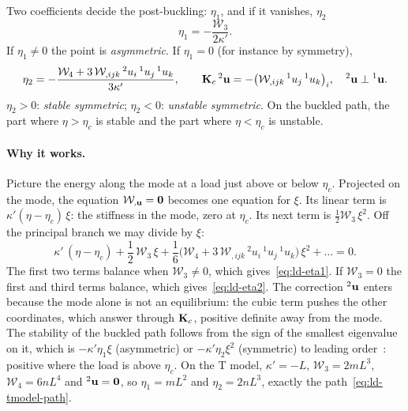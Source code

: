 \begin{gbox}{Two coefficients decide the post-buckling: $\eta_1$, and if it vanishes, $\eta_2$}\label{sec:ld-koitercoef}
%
\begin{equation}\label{eq:ld-eta1}
  \eta_1 = -\frac{\mathcal{W}_3}{2\kappa'} .
\end{equation}
If $\eta_1 \neq 0$ the point is \emph{asymmetric}. If $\eta_1 = 0$ (for instance by symmetry),
\begin{equation}\label{eq:ld-eta2}
  \eta_2 = -\frac{\mathcal{W}_4 + 3\,\mathcal{W}_{,ijk}\,{}^2u_i\,{}^1u_j\,{}^1u_k}{3\kappa'},
  \qquad
  \mathbf{K}_c\,{}^2\mathbf{u} = -\bigl(\mathcal{W}_{,ijk}\,{}^1u_j\,{}^1u_k\bigr)_i,
  \quad {}^2\mathbf{u}\perp{}^1\mathbf{u} .
\end{equation}
$\eta_2 > 0$: \emph{stable symmetric}; $\eta_2 < 0$: \emph{unstable symmetric}.
On the buckled path, the part where $\eta > \eta_c$ is stable and the part where
$\eta < \eta_c$ is unstable.
\end{gbox}

\paragraph{Why it works.}
Picture the energy along the mode at a load just above or below $\eta_c$. Projected
on the mode, the equation $\mathcal{W}_{,\mathbf{u}} = \mathbf{0}$ becomes one equation for
$\xi$. Its linear term is $\kappa'(\eta - \eta_c)\,\xi$: the stiffness in the mode,
zero at $\eta_c$. Its next term is $\tfrac12\mathcal{W}_3\,\xi^2$. Off the principal
branch we may divide by $\xi$:
\begin{equation}\label{eq:ld-reduced}
  \kappa'\,(\eta - \eta_c) + \frac12\,\mathcal{W}_3\,\xi
  + \frac16\bigl(\mathcal{W}_4 + 3\,\mathcal{W}_{,ijk}\,{}^2u_i\,{}^1u_j\,{}^1u_k\bigr)\,\xi^2
  + \dots = 0 .
\end{equation}
The first two terms balance when $\mathcal{W}_3 \neq 0$, which
gives~\eqref{eq:ld-eta1}. If $\mathcal{W}_3 = 0$ the first and third terms balance,
which gives~\eqref{eq:ld-eta2}. The correction ${}^2\mathbf{u}$ enters because the mode
alone is not an equilibrium: the cubic term pushes the other coordinates, which
answer through $\mathbf{K}_c$, positive definite away from the mode. The stability of
the buckled path follows from the sign of the smallest eigenvalue on it, which is
$-\kappa'\eta_1\xi$ (asymmetric) or $-\kappa'\eta_2\xi^2$ (symmetric) to leading
order~\cite[pp.~57--62]{ld-triantafyllidis2011}: positive where the load is above
$\eta_c$. On the T model, $\kappa' = -L$, $\mathcal{W}_3 = 2mL^3$,
$\mathcal{W}_4 = 6nL^4$ and ${}^2\mathbf{u} = \mathbf{0}$, so $\eta_1 = mL^2$ and $\eta_2 = 2nL^3$,
exactly the path~\eqref{eq:ld-tmodel-path}.

